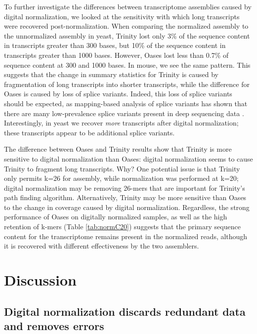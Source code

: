 \documentclass{pnastwo}
\begin{document}
\begin{article}
To further investigate the differences between transcriptome
assemblies caused by digital normalization, we looked at the
sensitivity with which long transcripts were recovered
post-normalization.  When comparing the normalized assembly to the
unnormalized assembly in yeast, Trinity lost only 3\% of the sequence
content in transcripts greater than 300 bases, but 10\% of the
sequence content in transcripts greater than 1000 bases.  However,
Oases lost less than 0.7\% of sequence content at 300 and
1000 bases.  In mouse, we see the same pattern.
This suggests that the change in summary statistics for
Trinity is caused by fragmentation of long transcripts into shorter
transcripts, while the difference for Oases is caused by loss of
splice variants.  Indeed, this
loss of splice variants should be expected, as mapping-based analysis
of splice variants has shown that there are many low-prevalence splice
variants present in deep sequencing data \cite{pubmed21151575}.
Interestingly, in yeast we recover {\em more} transcripts after
digital normalization; these transcripts appear to be additional splice
variants.


The difference between Oases and Trinity results show that Trinity is
more sensitive to digital normalization than Oases: digital
normalization seems to cause Trinity to fragment long transcripts.
Why?  One potential issue is that Trinity only permits k=26 for
assembly, while normalization was performed at k=20; digital
normalization may be removing 26-mers that are important for Trinity's
path finding algorithm.  Alternatively, Trinity may be more sensitive
than Oases to the change in coverage caused by digital normalization.
Regardless, the strong performance of Oases on digitally normalized
samples, as well as the high retention of k-mers (Table \ref{tab:normC20})
suggests that the primary sequence content for the transcriptome remains
present in the normalized reads, although it is recovered with different
effectiveness by the two assemblers.

\section{Discussion}

\subsection{Digital normalization discards redundant data and removes errors}


\end{article}
\end{document}

